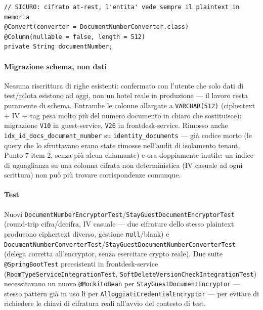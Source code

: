 ﻿\documentclass[a4paper,12pt]{report}
\begin{document}
\begin{securebox}[title={IdentityDocument.java --- cifratura trasparente via converter (fix)}]
\begin{lstlisting}[style=java]
// SICURO: cifrato at-rest, l'entita' vede sempre il plaintext in memoria
@Convert(converter = DocumentNumberConverter.class)
@Column(nullable = false, length = 512)
private String documentNumber;
\end{lstlisting}
\end{securebox}

\paragraph{Migrazione schema, non dati}
Nessuna riscrittura di righe esistenti: confermato con l'utente che solo
dati di test/pilota esistono ad oggi, non un hotel reale in produzione ---
il lavoro resta puramente di schema. Entrambe le colonne allargate a
\texttt{VARCHAR(512)} (ciphertext + IV + tag pesa molto più del numero
documento in chiaro che sostituisce): migrazione \texttt{V10} in
guest-service, \texttt{V26} in frontdesk-service. Rimosso anche
\texttt{idx\_id\_docs\_document\_number} su \texttt{identity\_documents} ---
già codice morto (le query che lo sfruttavano erano state rimosse
nell'audit di isolamento tenant, Punto 7 item 2, senza più alcun chiamante)
e ora doppiamente inutile: un indice di uguaglianza su una colonna cifrata
non deterministica (IV casuale ad ogni scrittura) non può più trovare
corrispondenze comunque.

\paragraph{Test}
Nuovi \texttt{DocumentNumberEncryptorTest}/\texttt{StayGuestDocumentEncryptorTest}
(round-trip cifra/decifra, IV casuale --- due cifrature dello stesso
plaintext producono ciphertext diverso, gestione \texttt{null}/blank) e
\texttt{DocumentNumberConverterTest}/\texttt{StayGuestDocumentNumberConverterTest}
(delega corretta all'encryptor, senza esercitare crypto reale). Due
suite \texttt{@SpringBootTest} preesistenti in frontdesk-service
(\texttt{RoomTypeServiceIntegrationTest}, \texttt{SoftDeleteVersionCheckIntegrationTest})
necessitavano un nuovo \texttt{@MockitoBean} per
\texttt{StayGuestDocumentEncryptor} --- stesso pattern già in uso lì per
\texttt{AlloggiatiCredentialEncryptor} --- per evitare di richiedere le
chiavi di cifratura reali all'avvio del contesto di test.
\end{document}
